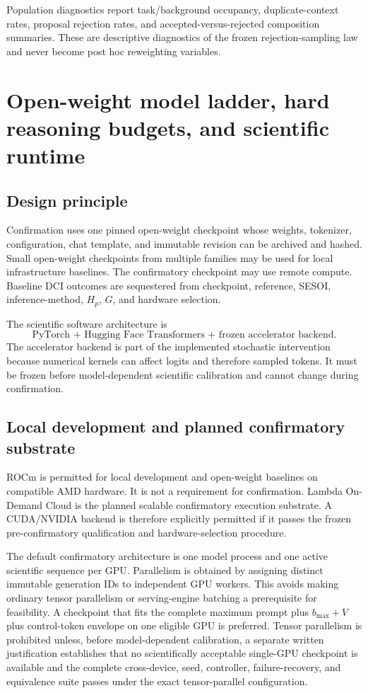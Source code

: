 \documentclass[11pt,a4paper]{article}
\begin{document}
Population diagnostics report task/background occupancy, duplicate-context rates, proposal rejection rates, and accepted-versus-rejected composition summaries. These are descriptive diagnostics of the frozen rejection-sampling law and never become post hoc reweighting variables.

\section{Open-weight model ladder, hard reasoning budgets, and scientific runtime}

\subsection{Design principle}
Confirmation uses one pinned open-weight checkpoint whose weights, tokenizer, configuration, chat template, and immutable revision can be archived and hashed. Small open-weight checkpoints from multiple families may be used for local infrastructure baselines. The confirmatory checkpoint may use remote compute. Baseline DCI outcomes are sequestered from checkpoint, reference, SESOI, inference-method, $H_p$, $G$, and hardware selection.

The scientific software architecture is
\[
\boxed{\text{PyTorch + Hugging Face Transformers + frozen accelerator backend}.}
\]
The accelerator backend is part of the implemented stochastic intervention because numerical kernels can affect logits and therefore sampled tokens. It must be frozen before model-dependent scientific calibration and cannot change during confirmation.

\subsection{Local development and planned confirmatory substrate}
ROCm is permitted for local development and open-weight baselines on compatible AMD hardware. It is not a requirement for confirmation. Lambda On-Demand Cloud is the planned scalable confirmatory execution substrate. A CUDA/NVIDIA backend is therefore explicitly permitted if it passes the frozen pre-confirmatory qualification and hardware-selection procedure.

The default confirmatory architecture is one model process and one active scientific sequence per GPU. Parallelism is obtained by assigning distinct immutable generation IDs to independent GPU workers. This avoids making ordinary tensor parallelism or serving-engine batching a prerequisite for feasibility. A checkpoint that fits the complete maximum prompt plus $b_{\max}+V$ plus control-token envelope on one eligible GPU is preferred. Tensor parallelism is prohibited unless, before model-dependent calibration, a separate written justification establishes that no scientifically acceptable single-GPU checkpoint is available and the complete cross-device, seed, controller, failure-recovery, and equivalence suite passes under the exact tensor-parallel configuration.
\end{document}
